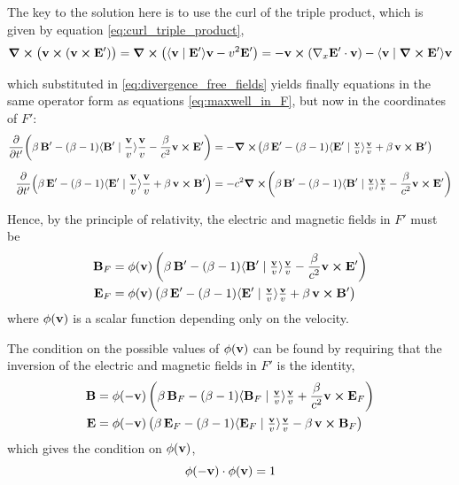 \documentclass[12pt]{article}
\newcommand{\ip}[2]{\langle #1 \mid #2 \rangle}
\begin{document}
The key to the solution here is to use the curl of the triple product, which is given by
equation \eqref{eq:curl_triple_product},
\begin{equation}
  \curl\bigl(\vb{v} \cross (\vb{v} \cross \vb{E}')\bigr)
  = \curl\bigl(\ip{\vb{v}}{\vb{E}'}\vb{v} - v^2\vb{E}'\bigr)
  = -\vb{v} \cross (\nabla_x \vb{E}' \cdot \vb{v}) - \ip{\vb{v}}{\curl \vb{E}'}\vb{v}
\end{equation}

which substituted in \eqref{eq:divergence_free_fields} yields finally equations in the same
operator form as equations \eqref{eq:maxwell_in_F}, but now in the coordinates of $F'$:
\begin{align}
  \pdv{}{t'}\!\left(\beta\,\vb{B}' - (\beta-1)\ip{\vb{B}'}{\frac{\vb{v}}{v}}\frac{\vb{v}}{v}
      - \frac{\beta}{c^2}\vb{v} \cross \vb{E}'\right)
    &= -\curl\!\left(\beta\,\vb{E}'
        - (\beta-1)\ip{\vb{E}'}{\tfrac{\vb{v}}{v}}\tfrac{\vb{v}}{v}
        + \beta\,\vb{v} \cross \vb{B}'\right) \label{eq:pre_final_maxwell} \\[6pt]
  \pdv{}{t'}\!\left(\beta\,\vb{E}' - (\beta-1)\ip{\vb{E}'}{\frac{\vb{v}}{v}}\frac{\vb{v}}{v}
      + \beta\,\vb{v} \cross \vb{B}'\right)
    &= -c^2\curl\!\left(\beta\,\vb{B}'
        - (\beta-1)\ip{\vb{B}'}{\tfrac{\vb{v}}{v}}\tfrac{\vb{v}}{v}
        - \frac{\beta}{c^2}\vb{v} \cross \vb{E}'\right) \nonumber
\end{align}

Hence, by the principle of relativity, the electric and magnetic fields in $F'$ must be
\begin{align}
  \vb{B}_F &= \phi(\vb{v})\left(
      \beta\,\vb{B}' - (\beta-1)\ip{\vb{B}'}{\tfrac{\vb{v}}{v}}\tfrac{\vb{v}}{v}
      - \frac{\beta}{c^2}\vb{v} \cross \vb{E}'
    \right) \\
  \vb{E}_F &= \phi(\vb{v})\left(
      \beta\,\vb{E}' - (\beta-1)\ip{\vb{E}'}{\tfrac{\vb{v}}{v}}\tfrac{\vb{v}}{v}
      + \beta\,\vb{v} \cross \vb{B}'
    \right)
\end{align}
where $\phi(\vb{v})$ is a scalar function depending only on the velocity.

The condition on the possible values of $\phi(\vb{v})$ can be found by requiring that the
inversion of the electric and magnetic fields in $F'$ is the identity,
\begin{align}
  \vb{B} &= \phi(-\vb{v})\left(
      \beta\,\vb{B}_F - (\beta-1)\ip{\vb{B}_F}{\tfrac{\vb{v}}{v}}\tfrac{\vb{v}}{v}
      + \frac{\beta}{c^2}\vb{v} \cross \vb{E}_F
    \right) \\
  \vb{E} &= \phi(-\vb{v})\left(
      \beta\,\vb{E}_F - (\beta-1)\ip{\vb{E}_F}{\tfrac{\vb{v}}{v}}\tfrac{\vb{v}}{v}
      - \beta\,\vb{v} \cross \vb{B}_F
    \right)
\end{align}
which gives the condition on $\phi(\vb{v})$,
\begin{equation}
  \phi(-\vb{v}) \cdot \phi(\vb{v}) = 1
\end{equation}
\end{document}
